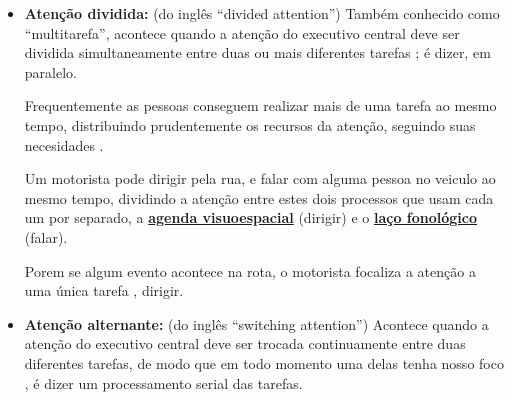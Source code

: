 \begin{itemize}
\item \textbf{Atenção dividida:} (do inglês ``divided attention'') 
Também conhecido como ``multitarefa'', acontece quando a atenção do executivo central deve ser dividida simultaneamente 
entre duas ou mais diferentes tarefas 
\cite[pp. 282]{braisby2012cognitive} \cite[pp. 155, 716]{eysenck2017manual} \cite[pp. 127]{eysenck2017manual};
é dizer, em paralelo.

Frequentemente as pessoas conseguem realizar mais de uma tarefa ao mesmo tempo,
distribuindo prudentemente os recursos da atenção, seguindo suas necesidades
\cite[pp. 124]{sternbergpsicologia}.

\begin{example}
\label{ex:motoristadividido}
Um motorista pode dirigir pela rua, e falar com alguma pessoa no veiculo ao mesmo tempo,
dividindo a atenção entre estes dois processos que usam cada um por separado,
a \hyperref[reflabel:visuoespacial]{\textbf{agenda  visuoespacial}} (dirigir)
e o \hyperref[reflabel:fonologico]{\textbf{laço fonológico}} (falar).

Porem se algum evento acontece na rota, o motorista focaliza a atenção a uma única tarefa ,
dirigir.
\end{example}

\item \textbf{Atenção alternante:} (do inglês ``switching attention'')
Acontece quando a atenção do executivo central deve ser trocada continuamente 
entre duas diferentes tarefas, de modo que em todo momento uma delas tenha nosso foco 
\cite[pp. 282]{braisby2012cognitive} \cite[pp. 127]{eysenck2017manual}, 
é dizer um processamento serial das tarefas.
\end{itemize}



